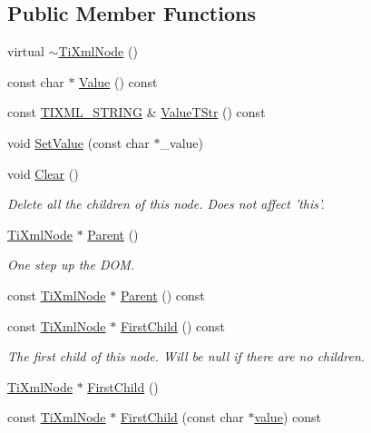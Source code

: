 \subsection*{Public Member Functions}
\begin{DoxyCompactItemize}
\item 
virtual \hyperlink{class_ti_xml_node_a027a76cccd359c831ee4024b58c49625}{$\sim$\+Ti\+Xml\+Node} ()
\item 
const char $\ast$ \hyperlink{class_ti_xml_node_a77943eb90d12c2892b1337a9f5918b41}{Value} () const 
\item 
const \hyperlink{tinyxml_8h_a92bada05fd84d9a0c9a5bbe53de26887}{T\+I\+X\+M\+L\+\_\+\+S\+T\+R\+I\+N\+G} \& \hyperlink{class_ti_xml_node_a83ece13d2ea66dac66e0b21332229239}{Value\+T\+Str} () const 
\item 
void \hyperlink{class_ti_xml_node_a2a38329ca5d3f28f98ce932b8299ae90}{Set\+Value} (const char $\ast$\+\_\+value)
\item 
void \hyperlink{class_ti_xml_node_a708e7f953df61d4d2d12f73171550a4b}{Clear} ()
\begin{DoxyCompactList}\small\item\em Delete all the children of this node. Does not affect 'this'. \end{DoxyCompactList}\item 
\hyperlink{class_ti_xml_node}{Ti\+Xml\+Node} $\ast$ \hyperlink{class_ti_xml_node_ab643043132ffd794f8602685d34a982e}{Parent} ()
\begin{DoxyCompactList}\small\item\em One step up the D\+O\+M. \end{DoxyCompactList}\item 
const \hyperlink{class_ti_xml_node}{Ti\+Xml\+Node} $\ast$ \hyperlink{class_ti_xml_node_a78878709e53066f06eb4fcbcdd3a5260}{Parent} () const 
\item 
const \hyperlink{class_ti_xml_node}{Ti\+Xml\+Node} $\ast$ \hyperlink{class_ti_xml_node_a44c8eee26bbe2d1b2762038df9dde2f0}{First\+Child} () const 
\begin{DoxyCompactList}\small\item\em The first child of this node. Will be null if there are no children. \end{DoxyCompactList}\item 
\hyperlink{class_ti_xml_node}{Ti\+Xml\+Node} $\ast$ \hyperlink{class_ti_xml_node_a5e97d69b7c0ebd27fb7286be56559b77}{First\+Child} ()
\item 
const \hyperlink{class_ti_xml_node}{Ti\+Xml\+Node} $\ast$ \hyperlink{class_ti_xml_node_ab5f722624113c8203227de4f56576d31}{First\+Child} (const char $\ast$\hyperlink{class_ti_xml_node_aead528b3cedc33c16a6c539872c7cc8b}{value}) const 

\end{DoxyCompactItemize}
